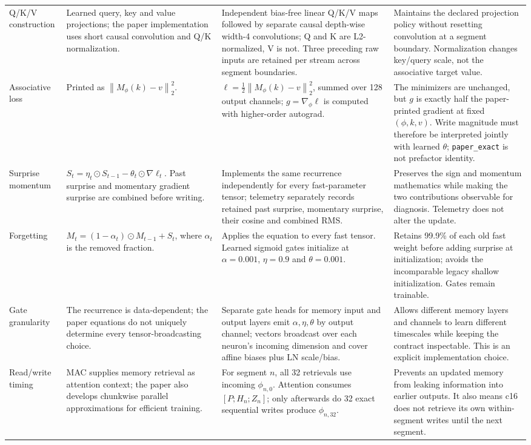 \documentclass[10pt,twocolumn]{article}
\newcommand{\code}[1]{\texttt{#1}}
\newcommand{\norm}[1]{\left\lVert#1\right\rVert}
\newcommand{\had}{\odot}
\begin{document}
\begin{table}[!t]
\begin{tabularx}{\textwidth}{@{}>{\raggedright\arraybackslash}p{}>{\raggedright\arraybackslash}p{}>{\raggedright\arraybackslash}p{}>{\raggedright\arraybackslash}X@{}}
Q/K/V construction & Learned query, key and value projections; the paper implementation uses short causal convolution and Q/K normalization. & Independent bias-free linear Q/K/V maps followed by separate causal depth-wise width-4 convolutions; Q and K are L2-normalized, V is not. Three preceding raw inputs are retained per stream across segment boundaries. & Maintains the declared projection policy without resetting convolution at a segment boundary. Normalization changes key/query scale, not the associative target value.\\
Associative loss & Printed as $\norm{M_{\phi}(k)-v}_2^2$. & $\ell=\tfrac12\norm{M_{\phi}(k)-v}_2^2$, summed over 128 output channels; $g=\nabla_{\phi}\ell$ is computed with higher-order autograd. & The minimizers are unchanged, but $g$ is exactly half the paper-printed gradient at fixed $(\phi,k,v)$. Write magnitude must therefore be interpreted jointly with learned $\theta$; \code{paper\_exact} is not prefactor identity.\\
Surprise momentum & $S_t=\eta_t\had S_{t-1}-\theta_t\had\nabla\ell_t$. Past surprise and momentary gradient surprise are combined before writing. & Implements the same recurrence independently for every fast-parameter tensor; telemetry separately records retained past surprise, momentary surprise, their cosine and combined RMS. & Preserves the sign and momentum mathematics while making the two contributions observable for diagnosis. Telemetry does not alter the update.\\
Forgetting & $M_t=(1-\alpha_t)\had M_{t-1}+S_t$, where $\alpha_t$ is the removed fraction. & Applies the equation to every fast tensor. Learned sigmoid gates initialize at $\alpha=0.001$, $\eta=0.9$ and $\theta=0.001$. & Retains 99.9\% of each old fast weight before adding surprise at initialization; avoids the incomparable legacy shallow initialization. Gates remain trainable.\\
Gate granularity & The recurrence is data-dependent; the paper equations do not uniquely determine every tensor-broadcasting choice. & Separate gate heads for memory input and output layers emit $\alpha,\eta,\theta$ by output channel; vectors broadcast over each neuron's incoming dimension and cover affine biases plus LN scale/bias. & Allows different memory layers and channels to learn different timescales while keeping the contract inspectable. This is an explicit implementation choice.\\
Read/write timing & MAC supplies memory retrieval as attention context; the paper also develops chunkwise parallel approximations for efficient training. & For segment $n$, all 32 retrievals use incoming $\phi_{n,0}$. Attention consumes $[P;H_n;Z_n]$; only afterwards do 32 exact sequential writes produce $\phi_{n,32}$. & Prevents an updated memory from leaking information into earlier outputs. It also means c16 does not retrieve its own within-segment writes until the next segment.\\

\end{tabularx}
\end{table}
\end{document}
